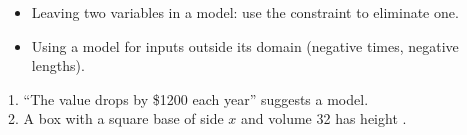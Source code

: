 \begin{mistakes}
\begin{itemize}
\item Leaving two variables in a model: use the constraint to eliminate one.
\item Using a model for inputs outside its domain (negative times, negative lengths).
\end{itemize}
\end{mistakes}

\begin{quickcheck}
1. ``The value drops by \$1200 each year'' suggests a  model.\\
2. A box with a square base of side $x$ and volume 32 has height .
\end{quickcheck}
